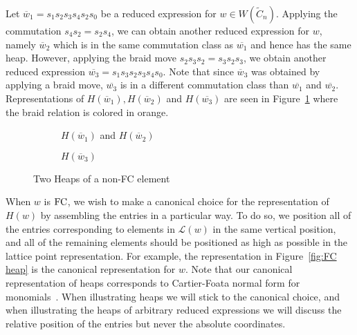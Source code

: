 \begin{example}
Let $\overline{w}_1=s_1s_2s_3s_4s_2s_0$ be a reduced expression for $w \in W(\widetilde{C}_n)$. Applying the commutation $s_4s_2=s_2s_4$, we can obtain another reduced expression for $w$, namely $\overline{w}_2$ which is in the same commutation class as $\overline{w_1}$ and hence has the same heap. However, applying the braid move $s_2s_3s_2=s_3s_2s_3$, we obtain another reduced expression $\overline{w_3}=s_1s_3s_2s_3s_4s_0$. Note that since $\overline{w}_3$ was obtained by applying a braid move, $\overline{w_3}$ is in a different commutation class than $\overline{w_1}$ and $\overline{w_2}$. Representations of $H(\overline{w}_1), H(\overline{w}_2)$ and $H(\overline{w_3})$ are seen in Figure~\ref{fig:not FC} where the braid relation is colored in orange.

\begin{figure}[h]
\centering
\begin{subfigure}[b]{0.3\textwidth}	
\centering
{}
\caption{$H(\overline{w}_1)$ and $H(\overline{w}_2)$}
\end{subfigure}
\begin{subfigure}[b]{0.3\textwidth}	
\centering
{}
\caption{$H(\overline{w}_3)$}
\end{subfigure}
\caption{Two Heaps of a non-FC element}	
\label{fig:not FC}
\end{figure}
\end{example}

When $w$ is $\mathrm{FC}$, we wish to make a canonical choice for the representation of $H(w)$ by assembling the entries in a particular way. To do so, we position all of the entries corresponding to elements in $\mathcal{L}(w)$ in the same vertical position, and all of the remaining elements should be positioned as high as possible in the lattice point representation. For example, the representation in Figure~\ref{fig:FC heap} is the canonical representation for $w$. Note that our canonical representation of heaps corresponds to Cartier-Foata normal form for monomials~\cite{Cartier1969, Green2006a}. When illustrating heaps we will stick to the canonical choice, and when illustrating the heaps of arbitrary reduced expressions we will discuss the relative position of the entries but never the absolute coordinates. 
